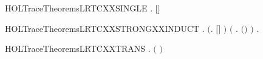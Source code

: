 \newcommand{\HOLTraceTheoremsLRTCXXRULES}{\UseVerbatim{HOLTraceTheoremsLRTCXXRULES}}
\begin{SaveVerbatim}{HOLTraceTheoremsLRTCXXSINGLE}
\HOLTokenTurnstile{} \HOLSymConst{\HOLTokenForall{}}   .     \HOLSymConst{\HOLTokenImp{}}    \ensuremath{[}\ensuremath{]} 
\end{SaveVerbatim}
\newcommand{\HOLTraceTheoremsLRTCXXSINGLE}{\UseVerbatim{HOLTraceTheoremsLRTCXXSINGLE}}
\begin{SaveVerbatim}{HOLTraceTheoremsLRTCXXSTRONGXXINDUCT}
\HOLTokenTurnstile{} \HOLSymConst{\HOLTokenForall{}} .
       \ensuremath{(}\HOLSymConst{\HOLTokenForall{}}.   \ensuremath{[}\ensuremath{]} \ensuremath{)} \HOLSymConst{\HOLTokenConj{}}
       \ensuremath{(}\HOLSymConst{\HOLTokenForall{}}    .
                \HOLSymConst{\HOLTokenConj{}}      \HOLSymConst{\HOLTokenConj{}}     \HOLSymConst{\HOLTokenImp{}}   \ensuremath{(}\HOLSymConst{::}\ensuremath{)} \ensuremath{)} \HOLSymConst{\HOLTokenImp{}}
       \HOLSymConst{\HOLTokenForall{}}  .      \HOLSymConst{\HOLTokenImp{}}    
\end{SaveVerbatim}
\newcommand{\HOLTraceTheoremsLRTCXXSTRONGXXINDUCT}{\UseVerbatim{HOLTraceTheoremsLRTCXXSTRONGXXINDUCT}}
\begin{SaveVerbatim}{HOLTraceTheoremsLRTCXXTRANS}
\HOLTokenTurnstile{} \HOLSymConst{\HOLTokenForall{}}     .
            \HOLSymConst{\HOLTokenConj{}}      \HOLSymConst{\HOLTokenImp{}}    \ensuremath{(} \HOLSymConst{++} \ensuremath{)} 
\end{SaveVerbatim}
